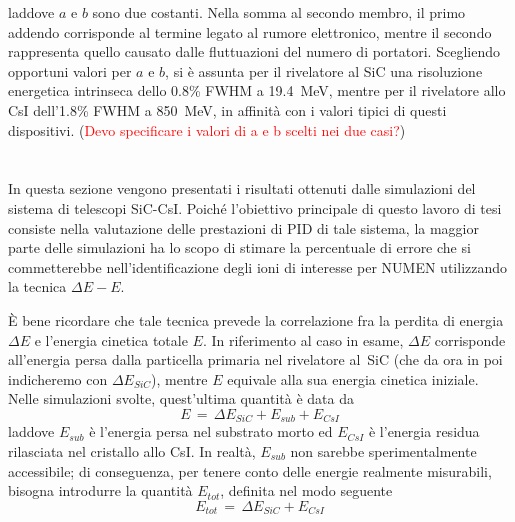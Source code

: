 laddove $a$ e $b$ sono due costanti.
Nella somma al secondo membro, il primo addendo corrisponde al termine legato al rumore elettronico, mentre il secondo rappresenta quello causato dalle fluttuazioni del numero di portatori.
%
%
Scegliendo opportuni valori per $a$ e $b$, si è assunta per il rivelatore al SiC una risoluzione energetica intrinseca dello 0.8\% FWHM a 19.4~MeV, mentre per il rivelatore allo CsI dell'1.8\% FWHM a 850~MeV, in affinità con i valori tipici di questi dispositivi. (\textcolor{red}{Devo specificare i valori di a e b scelti nei due casi?})









\section{}

In questa sezione vengono presentati i risultati ottenuti dalle simulazioni \geant{} del sistema di telescopi SiC-CsI.
Poiché l'obiettivo principale di questo lavoro di tesi consiste nella valutazione delle prestazioni di PID di tale sistema, la maggior parte delle simulazioni ha lo scopo di stimare la percentuale di errore che si commetterebbe nell'identificazione degli ioni di interesse per NUMEN utilizzando la tecnica $\Delta E - E$.

È bene ricordare che tale tecnica prevede la correlazione fra la perdita di energia $\Delta E$ e l'energia cinetica totale $E$. In riferimento al caso in esame, $\Delta E$ corrisponde all'energia persa dalla particella primaria nel rivelatore al~SiC (che da ora in poi indicheremo con $ \Delta E_{SiC}$), mentre $E$ equivale alla sua energia cinetica iniziale. Nelle simulazioni svolte, quest'ultima quantità è data da
\begin{equation}
	E \, = \, \Delta E_{SiC} + E_{sub} + E_{CsI}
\end{equation}
laddove $E_{sub}$ è l'energia persa nel substrato morto ed $E_{CsI}$ è l'energia residua rilasciata nel cristallo allo CsI.
In realtà, $E_{sub}$ non sarebbe sperimentalmente accessibile; di conseguenza, per tenere conto delle energie realmente misurabili, bisogna introdurre la quantità $E_{tot}$, definita nel modo seguente
\begin{equation}
	E_{tot} \, = \, \Delta E_{SiC} + E_{CsI}
\end{equation}

